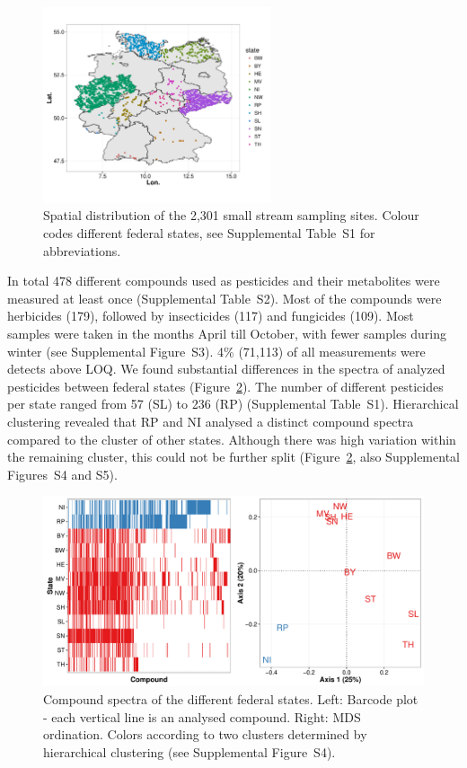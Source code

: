 \documentclass[journal=esthag,manuscript=article]{achemso}
\begin{document}
\begin{figure}[ht]
  \includegraphics[width=0.6\textwidth]{figure1.pdf}
  \caption{Spatial distribution of the 2,301 small stream sampling sites. Colour codes different federal states, see Supplemental Table~S1 for abbreviations.}
  \label{fig:fig1}
\end{figure}

In total 478 different compounds used as pesticides and their metabolites were measured at least once (Supplemental Table~S2). 
Most of the compounds were herbicides (179), followed by insecticides (117) and fungicides (109). %
Most samples were taken in the months April till October, with fewer samples during winter (see Supplemental Figure~S3).
4\% (71,113) of all measurements were detects above LOQ.
We found substantial differences in the spectra of analyzed pesticides between federal states (Figure~\ref{fig:fig2}).
The number of different pesticides per state ranged from 57 (SL) to 236 (RP) (Supplemental Table~S1).
Hierarchical clustering revealed that RP and NI analysed a distinct compound spectra compared to the cluster of other states.
Although there was high variation within the remaining cluster, this could not be further split (Figure~\ref{fig:fig2}, also Supplemental Figures~S4 and S5).

\begin{figure}[ht]
  \includegraphics[width=\textwidth]{figure2.pdf}
  \caption{Compound spectra of the different federal states. Left: Barcode plot - each vertical line is an analysed compound. Right: MDS ordination. 
  Colors according to two clusters determined by hierarchical clustering (see Supplemental Figure~S4).}
  \label{fig:fig2}
\end{figure}
\end{document}

